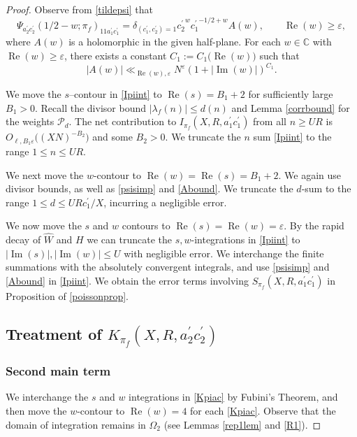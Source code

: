 \documentclass[12pt,reqno]{amsart}
\theoremstyle{plain}
\theoremstyle{remark}
\renewcommand{\Im}{\operatorname{Im}}
\renewcommand{\Re}{\operatorname{Re}}
\numberwithin{equation}{section}
\numberwithin{lemma}{section}
\numberwithin{theorem}{section}
\numberwithin{prop}{section}
\numberwithin{remark}{section}
\begin{document}
\begin{proof}
Observe from \eqref{tildepsi} that
\begin{equation} \label{psisimp}
\Psi_{a_2^{\prime} c_2^{\prime}}(1/2-w;\pi_f)_{11a_1^{\prime} c_1^{\prime}}=
\delta_{(c_1^{\prime},c_2^{\prime})=1}
{c_2^{\prime}}^{w} {c_1^{\prime}}^{-1/2+w} A(w), \qquad \Re(w) \geq \varepsilon,
\end{equation}
where $A(w)$ is a holomorphic in the given half-plane. 
For each $w \in \mathbb{C}$ with $\Re(w) \geq \varepsilon$, 
there exists a constant $C_1:=C_1 \big({\Re(w)} \big)$
such that 
\begin{equation} \label{Abound}
|A(w)| \ll_{\Re(w),\varepsilon} 
N^{\varepsilon} (1+|\Im(w)|)^{C_1}.
\end{equation}

We move the $s$--contour in \eqref{Ipiint} to $\Re(s)=B_1+2$ 
for sufficiently large $B_1>0$.
Recall the divisor bound $|\lambda_f(n)| \leq d(n)$ \cite{De} 
and Lemma \ref{corrbound} for the weights $\mathcal{P}_d$.
The net contribution 
to $I_{\pi_f}(X,R,a^{\prime}_1 c^{\prime}_1)$ from all $n \geq U R$ is 
$O_{\ell, B_1 \varepsilon} \big((XN)^{-B_2} \big)$
and some $B_2>0$.
We truncate the $n$ sum \eqref{Ipiint} to the range $1 \leq n \leq U R$.

We next move the $w$-contour to $\Re(w)=\Re(s)=B_1+2$. 
We again use divisor bounds, as well as \eqref{psisimp} and \eqref{Abound}. 
We truncate 
the $d$-sum to the range $1 \leq d \leq  UR c_1^{\prime}/X$,
incurring a negligible error.

We now move the $s$ and $w$ contours to $\Re(s)=\Re(w)=\varepsilon$.
By the rapid decay of $\widehat{W}$ and $H$ we can truncate
 the $s,w$-integrations in \eqref{Ipiint}
to $|\Im(s)|, |\Im(w)| \leq U$ with negligible error.
We interchange the finite summations with the absolutely convergent integrals,
and use \eqref{psisimp} and \eqref{Abound} in \eqref{Ipiint}. 
We obtain the error terms involving $S_{\pi_f}(X,R,a_1^{\prime} c_1^{\prime})$ in 
Proposition of \ref{poissonprop}.

\subsection{Treatment of $K_{\pi_f}(X,R,a_2^{\prime} c^{\prime}_2)$}
\subsubsection{Second main term}
We interchange the $s$ and $w$ integrations in \eqref{Kpiac} by Fubini's Theorem,
and then move the $w$-contour to $\Re(w)=4$ for each \eqref{Kpiac}. Observe
that the domain of integration remains in $\Omega_2$ 
(see Lemmas \ref{rep1lem} and \ref{R1}). 


\end{proof}
\end{document}
